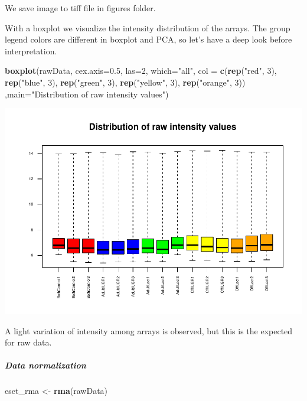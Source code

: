 \documentclass[]{article}
\newenvironment{Shaded}{\begin{snugshade}}{\end{snugshade}}
\newcommand{\KeywordTok}[1]{\textcolor[rgb]{0.13,0.29,0.53}{\textbf{#1}}}
\newcommand{\DataTypeTok}[1]{\textcolor[rgb]{0.13,0.29,0.53}{#1}}
\newcommand{\DecValTok}[1]{\textcolor[rgb]{0.00,0.00,0.81}{#1}}
\newcommand{\FloatTok}[1]{\textcolor[rgb]{0.00,0.00,0.81}{#1}}
\newcommand{\StringTok}[1]{\textcolor[rgb]{0.31,0.60,0.02}{#1}}
\newcommand{\NormalTok}[1]{#1}
\let\oldsubparagraph\subparagraph
\renewcommand{\subparagraph}[1]{\oldsubparagraph{#1}\mbox{}}
\begin{document}
We save image to tiff file in figures folder.

With a boxplot we visualize the intensity distribution of the arrays.
The group legend colors are different in boxplot and PCA, so let's have
a deep look before interpretation.

\begin{Shaded}
\begin{Highlighting}[]
\KeywordTok{boxplot}\NormalTok{(rawData, }\DataTypeTok{cex.axis=}\FloatTok{0.5}\NormalTok{, }\DataTypeTok{las=}\DecValTok{2}\NormalTok{,  }\DataTypeTok{which=}\StringTok{"all"}\NormalTok{, }
\DataTypeTok{col =} \KeywordTok{c}\NormalTok{(}\KeywordTok{rep}\NormalTok{(}\StringTok{"red"}\NormalTok{, }\DecValTok{3}\NormalTok{), }\KeywordTok{rep}\NormalTok{(}\StringTok{"blue"}\NormalTok{, }\DecValTok{3}\NormalTok{), }
        \KeywordTok{rep}\NormalTok{(}\StringTok{"green"}\NormalTok{, }\DecValTok{3}\NormalTok{), }\KeywordTok{rep}\NormalTok{(}\StringTok{"yellow"}\NormalTok{, }\DecValTok{3}\NormalTok{), }\KeywordTok{rep}\NormalTok{(}\StringTok{"orange"}\NormalTok{, }\DecValTok{3}\NormalTok{))}
\NormalTok{,}\DataTypeTok{main=}\StringTok{"Distribution of raw intensity values"}\NormalTok{)}
\end{Highlighting}
\end{Shaded}

\includegraphics{delVal_AnaIsabel_ADO_PEC1_files/figure-latex/unnamed-chunk-13-1.pdf}

A light variation of intensity among arrays is observed, but this is the
expected for raw data.

\subparagraph{Data normalization}\label{data-normalization}

\begin{Shaded}
\begin{Highlighting}[]
\NormalTok{eset_rma <-}\StringTok{ }\KeywordTok{rma}\NormalTok{(rawData)}
\end{Highlighting}
\end{Shaded}
\end{document}
